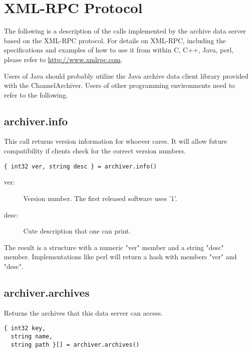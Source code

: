 \section{XML-RPC Protocol} \label{sec:xmlprotocol}
The following is a description of the calls implemented by the archive
data server based on the XML-RPC protocol.
For details on XML-RPC, including the specifications and examples of
how to use it from within C, C++, Java, perl, please refer to
\href{http://www.xmlrpc.com}{http://www.xmlrpc.com}.

Users of Java should probably utilize the Java archive data client
library provided with the ChannelArchiver. Users of other programming
environments need to refer to the following.

\subsection{archiver.info} %
This call returns version information for 
whoever cares. It will allow future compatibility
if clients check for the correct version numbers.

\begin{lstlisting}[keywordstyle=\sffamily]
{ int32 ver, string desc } = archiver.info()
\end{lstlisting}

\begin{description}
\item[\sffamily ver:]  Version number. The first released software uses '1'.
\item[\sffamily desc:] Cute description that one can print.
\end{description}

\noindent The result is a structure with a numeric "ver"
member and a string "desc" member. Implementations
like perl will return a hash with members "ver"
and "desc".

\subsection{archiver.archives} %
Returns the archives that this data server can access.

\begin{lstlisting}[keywordstyle=\sffamily]
{ int32 key,
  string name,
  string path }[] = archiver.archives()
\end{lstlisting}

